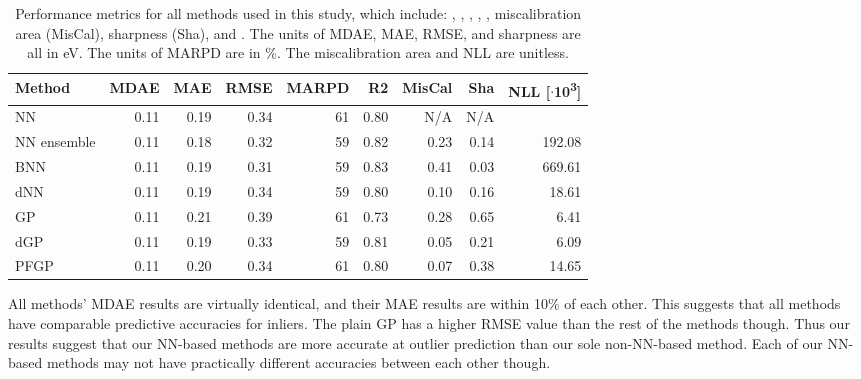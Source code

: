 \documentclass[]{achemso}
\begin{document}
\begin{table}
    \centering
    \begin{tabular}{lrrrrrrrr}
        \toprule
        Method              & \gls{MDAE}    & \gls{MAE} & \gls{RMSE}    & \gls{MARPD}   & \gls{R2}  & MisCal    & Sha   & \gls{NLL} [$\cdot$10\textsuperscript{3}] \\
        \midrule
        \gls{NN}            & 0.11          & 0.19      & 0.34          & 61            & 0.80      & N/A       & N/A   & \\
        \gls{NN} ensemble   & 0.11          & 0.18      & 0.32          & 59            & 0.82      & 0.23      & 0.14  & 192.08 \\
        \gls{BNN}           & 0.11          & 0.19      & 0.31          & 59            & 0.83      & 0.41      & 0.03  & 669.61 \\
        \gls{dNN}           & 0.11          & 0.19      & 0.34          & 59            & 0.80      & 0.10      & 0.16  & 18.61 \\
        \gls{GP}            & 0.11          & 0.21      & 0.39          & 61            & 0.73      & 0.28      & 0.65  & 6.41 \\
        \gls{dGP}           & 0.11          & 0.19      & 0.33          & 59            & 0.81      & 0.05      & 0.21  & 6.09 \\
        \gls{PFGP}          & 0.11          & 0.20      & 0.34          & 61            & 0.80      & 0.07      & 0.38  & 14.65 \\
        \bottomrule
    \end{tabular}
    \caption{Performance metrics for all methods used in this study, which include:
    , , , ,
    , miscalibration area (MisCal), sharpness (Sha), and .
    The units of \gls{MDAE}, \gls{MAE}, \gls{RMSE}, and sharpness are all in \gls{eV}.
    The units of \gls{MARPD} are in \%.
    The miscalibration area and \gls{NLL} are unitless.}\label{tab:results}
\end{table}

All methods' \gls{MDAE} results are virtually identical, and their \gls{MAE} results are within 10\% of each other.
This suggests that all methods have comparable predictive accuracies for inliers.
The plain \gls{GP} has a higher \gls{RMSE} value than the rest of the methods though.
Thus our results suggest that our \gls{NN}-based methods are more accurate at outlier prediction than our sole non-\gls{NN}-based method.
Each of our \gls{NN}-based methods may not have practically different accuracies between each other though.
\end{document}
